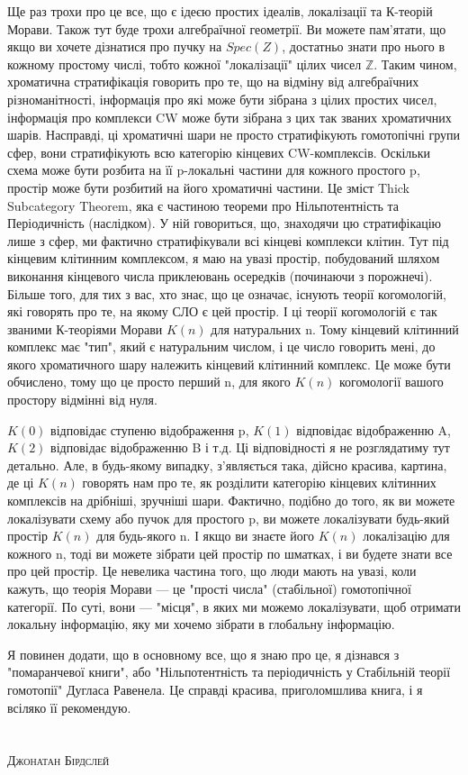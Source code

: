 Ще раз трохи про це все, що є ідеєю простих ідеалів, локалізації
та К-теорій Морави. Також тут буде трохи алгебраїчної геометрії.
Ви можете пам'ятати, що якщо ви хочете дізнатися про пучку на $Spec(Z)$,
достатньо знати про нього в кожному простому числі, тобто кожної "локалізації"
цілих чисел $\mathbb{Z}$. Таким чином, хроматична стратифікація говорить про те,
що на відміну від алгебраїчних різноманітності, інформація про які може
бути зібрана з цілих простих чисел, інформація про комплекси CW може бути
зібрана з цих так званих хроматичних шарів. Насправді, ці хроматичні шари
не просто стратифікують гомотопічні групи сфер, вони стратифікують всю
категорію кінцевих CW-комплексів. Оскільки схема може бути розбита на
її p-локальні частини для кожного простого p, простір може бути розбитий
на його хроматичні частини. Це зміст Thick Subcategory Theorem, яка є
частиною теореми про Нільпотентність та Періодичність (наслідком).
У ній говориться, що, знаходячи цю стратифікацію лише з сфер, ми фактично
стратифікували всі кінцеві комплекси клітин. Тут під кінцевим клітинним
комплексом, я маю на увазі простір, побудований шляхом виконання кінцевого
числа приклеювань осередків (починаючи з порожнечі). Більше того, для тих
з вас, хто знає, що це означає, існують теорії когомологій, які говорять
про те, на якому СЛО є цей простір. І ці теорії когомологій є так званими
К-теоріями Морави $K(n)$ для натуральних n. Тому кінцевий клітинний
комплекс має "тип", який є натуральним числом, і це число говорить
мені, до якого хроматичного шару належить кінцевий клітинний комплекс.
Це може бути обчислено, тому що це просто перший n, для якого $K(n)$
когомології вашого простору відмінні від нуля.

$K(0)$ відповідає ступеню відображення p, $K(1)$ відповідає відображенню A, $K(2)$
відповідає відображенню B і т.д. Ці відповідності я не розглядатиму
тут детально. Але, в будь-якому випадку, з'являється така, дійсно
красива, картина, де ці $K(n)$ говорять нам про те, як розділити
категорію кінцевих клітинних комплексів на дрібніші, зручніші шари.
Фактично, подібно до того, як ви можете локалізувати схему або пучок
для простого p, ви можете локалізувати будь-який простір $K(n)$ для
будь-якого n. І якщо ви знаєте його $K(n)$ локалізацію для кожного n,
тоді ви можете зібрати цей простір по шматках, і ви будете знати все
про цей простір. Це невелика частина того, що люди мають на увазі,
коли кажуть, що теорія Морави --- це "прості числа" (стабільної) гомотопічної
категорії. По суті, вони --- "місця", в яких ми можемо локалізувати, щоб
отримати локальну інформацію, яку ми хочемо зібрати в глобальну інформацію.

Я повинен додати, що в основному все, що я знаю про це, я дізнався
з "помаранчевої книги", або "Нільпотентність та періодичність у Стабільній
теорії гомотопії" Дугласа Равенела. Це справді красива, приголомшлива книга,
і я всіляко її рекомендую.
\\
\\
\\
\textsc{\footnotesize Джонатан Бірдслей}
